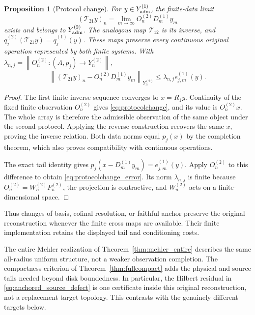 \documentclass[11pt,a4paper]{amsart}
\numberwithin{equation}{section}
\newtheorem{proposition}[theorem]{Proposition}
\theoremstyle{definition}
\theoremstyle{remark}
\newcommand{\norm}[1]{\left\lVert#1\right\rVert}
\begin{document}
\begin{proposition}[Protocol change]\label{prop:protocolchange}
For $y\in Y_{\rm adm}^{(1)}$, the finite-data limit
\begin{equation}\label{eq:protocolchange}
 (\mathcal T_{21}y)_n=\lim_{m\to\infty}O_n^{(2)}D_m^{(1)}y_m
\end{equation}
exists and belongs to $Y_{\rm adm}^{(2)}$. The analogous map $\mathcal T_{12}$ is its inverse, and
$q_j^{(2)}(\mathcal T_{21}y)=q_j^{(1)}(y)$.
These maps preserve every continuous original operation represented by both finite systems. With
$\lambda_{n,j}=\norm{O_n^{(2)}:(A,p_j)\to Y_n^{(2)}}$,
\begin{equation}\label{eq:protocolchange_error}
 \norm{(\mathcal T_{21}y)_n-O_n^{(2)}D_m^{(1)}y_m}_{Y_n^{(2)}}
 \le\lambda_{n,j}e_{j,m}^{(1)}(y).
\end{equation}
\end{proposition}
\begin{proof}
The first finite inverse sequence converges to $x=R_1y$. Continuity of the fixed finite observation $O_n^{(2)}$ gives \eqref{eq:protocolchange}, and its value is $O_n^{(2)}x$. The whole array is therefore the admissible observation of the same object under the second protocol. Applying the reverse construction recovers the same $x$, proving the inverse relation. Both data norms equal $p_j(x)$ by the completion theorem, which also proves compatibility with continuous operations.

The exact tail identity gives
$p_j(x-D_m^{(1)}y_m)=e_{j,m}^{(1)}(y)$.
Apply $O_n^{(2)}$ to this difference to obtain \eqref{eq:protocolchange_error}. Its norm $\lambda_{n,j}$ is finite because $O_n^{(2)}=W_n^{(2)}P_n^{(2)}$, the projection is contractive, and $W_n^{(2)}$ acts on a finite-dimensional space.
\end{proof}
Thus changes of basis, cofinal resolution, or faithful anchor preserve the original reconstruction whenever the finite cross maps are available. Their finite implementation retains the displayed tail and conditioning costs.

The entire Mehler realization of Theorem~\ref{thm:mehler_entire} describes the same all-radius uniform structure, not a weaker observation completion. The compactness criterion of Theorem~\ref{thm:fullcompact} adds the physical and source tails needed beyond disk boundedness. In particular, the Hilbert residual in \eqref{eq:anchored_source_defect} is one certificate inside this original reconstruction, not a replacement target topology. This contrasts with the genuinely different targets below.
\end{document}
